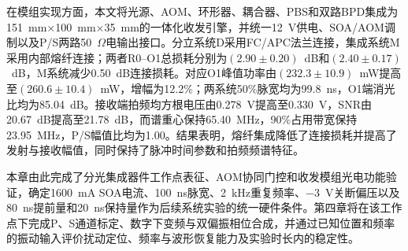 在模组实现方面，本文将光源、AOM、环形器、耦合器、PBS和双路BPD集成为151~mm$\times$100~mm$\times$35~mm的一体化收发引擎，并统一12~V供电、SOA/AOM调制以及P/S两路50~$\Omega$电输出接口。分立系统D采用FC/APC法兰连接，集成系统M采用内部熔纤连接；两者R0--O1总损耗分别为$(2.90\pm0.20)$~dB和$(2.40\pm0.17)$~dB，M系统减少0.50~dB连接损耗。对应O1峰值功率由$(232.3\pm10.9)$~mW提高至$(260.6\pm10.4)$~mW，增幅为12.2\%；两系统50\%脉宽均为99.8~ns，O1端消光比均为85.04~dB。接收端拍频均方根电压由0.278~V提高至0.330~V，SNR由20.67~dB提高至21.78~dB，而谱重心保持65.40~MHz，90\%占用带宽保持23.95~MHz，P/S幅值比均为1.00。结果表明，熔纤集成降低了连接损耗并提高了发射与接收幅值，同时保持了脉冲时间参数和拍频频谱特征。

本章由此完成了分光集成器件工作点表征、AOM协同门控和收发模组光电功能验证，确定1600~mA SOA电流、100~ns脉宽、2~kHz重复频率、$-3$~V关断偏压以及80~ns提前量和20~ns保持量作为后续系统实验的统一硬件条件。第四章将在该工作点下完成P、S通道标定、数字下变频与双偏振相位合成，并通过已知位置和频率的振动输入评价扰动定位、频率与波形恢复能力及实验时长内的稳定性。
